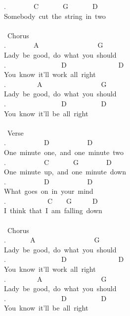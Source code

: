 {.\ \ \ \ \ \ \ \ C\ \ \ \ \ \ \ G\ \ \ \ \ \ \ D\\
Somebody\ cut\ the\ string\ in\ two\\
\\
\lbrack\ Chorus\rbrack\\
.\ \ \ \ \ \ \ \ A\ \ \ \ \ \ \ \ \ \ \ \ \ \ \ \ \ G\\
Lady\ be\ good,\ do\ what\ you\ should\\
.\ \ \ \ \ \ \ \ \ \ \ \ \ \ \ \ D\ \ \ \ \ \ \ \ \ \ \ \ \ \ \ D\\
You\ know\ it'll\ work\ all\ right\\
.\ \ \ \ \ \ \ \ \ A\ \ \ \ \ \ \ \ \ \ \ \ \ \ \ \ \ G\\
Lady\ be\ good,\ do\ what\ you\ should\\
.\ \ \ \ \ \ \ \ \ \ \ \ \ \ \ \ D\ \ \ \ \ \ \ \ \ \ D\ \\
You\ know\ it'll\ be\ all\ right\\
\\
\lbrack\ Verse\rbrack\\
.\ \ \ \ \ \ \ \ \ \ \ D\ \ \ \ \ \ \ \ \ \ \ D\\
One\ minute\ one,\ and\ one\ minute\ two\\
.\ \ \ \ \ \ \ \ \ \ \ C\ \ \ \ \ \ \ G\ \ \ \ \ \ \ \ D\\
One\ minute\ up,\ and\ one\ minute\ down\\
.\ \ \ \ \ \ \ \ \ \ \ D\ \ \ \ \ \ \ \ \ \ \ D\\
What\ goes\ on\ in\ your\ mind\\
.\ \ \ \ \ \ \ \ \ \ \ \ C\ \ \ \ G\ \ \ \ \ \ D\\
I\ think\ that\ I\ am\ falling\ down\\
\\
\lbrack\ Chorus\rbrack\\
.\ \ \ \ \ \ \ A\ \ \ \ \ \ \ \ \ \ \ \ \ \ \ \ \ G\\
Lady\ be\ good,\ do\ what\ you\ should\\
.\ \ \ \ \ \ \ \ \ \ \ \ \ \ \ \ D\ \ \ \ \ \ \ \ \ \ \ \ \ \ \ D\\
You\ know\ it'll\ work\ all\ right\\
.\ \ \ \ \ \ \ \ \ A\ \ \ \ \ \ \ \ \ \ \ \ \ \ \ \ \ G\\
Lady\ be\ good,\ do\ what\ you\ should\\
.\ \ \ \ \ \ \ \ \ \ \ \ \ \ \ \ D\ \ \ \ \ \ \ \ \ \ D\ \\
You\ know\ it'll\ be\ all\ right}
